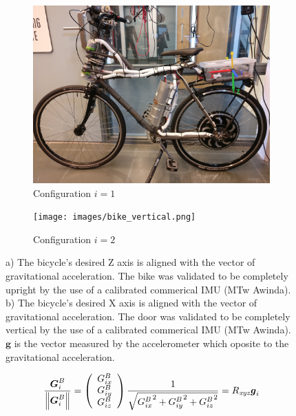  \begin{figure}
    \centering
    \begin{subfigure}[htbb]{0.48\textwidth}
        \centering
        \includegraphics[width=\textwidth]{images/bike_upright.jpg}
        \caption{Configuration \ensuremath{i=1}}
        \label{fig:config1}
    \end{subfigure}
    \hfill
    \begin{subfigure}[htbb]{0.48\textwidth}
        \centering
        \texttt{[image: images/bike\_vertical.png]}
        \caption{Configuration \ensuremath{i=2}}
        \label{fig:config2}
    \end{subfigure}
    \caption{a) The bicycle's desired Z axis is aligned with the vector of gravitational acceleration. The bike was validated to be completely upright by the use of a calibrated commerical IMU (MTw Awinda). b) The bicycle's desired X axis is aligned with the vector of gravitational acceleration. The door was validated to be completely vertical by the use of a calibrated commerical IMU (MTw Awinda). \ensuremath{\mathbf{g}} is the vector measured by the accelerometer which oposite to the gravitational acceleration.}
 \end{figure}
 \begin{equation}
 \frac{\boldsymbol{G}_{i}^B}{\left\lVert\boldsymbol{G}_{i}^B\right\rVert}=\left(\begin{array}{l}{G_{i x}^B} \\ {G_{i y}^B} \\ {G_{i z}^B}\end{array}\right)\frac{1}{\sqrt{{G_{i x}^B}^2+{G_{i y}^B}^2+{G_{i z}^B}^2}}=R_{\mathit{xyz}}\boldsymbol{g}_i
\label{eq:firstIMU}
 \end{equation}
 
